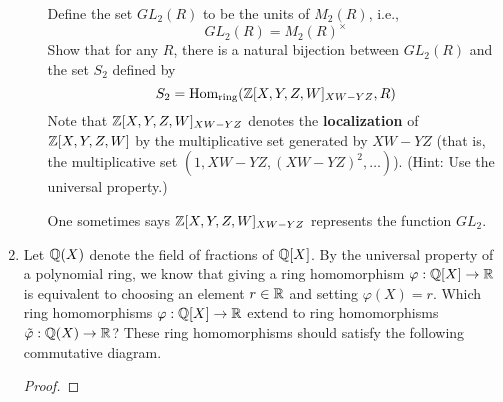 \documentclass[../psets.tex]{subfiles}
\begin{document}
\begin{enumerate}
\begin{enumerate}[label={(\alph*)}]
        Define the set $GL_2(R)$ to be the units of $M_2(R)$, i.e.,
        \begin{equation*}
            GL_2(R) = M_2(R)^\times
        \end{equation*}
        Show that for any $R$, there is a natural bijection between $GL_2(R)$ and the set $S_2$ defined by
        \begin{equation*}
            S_2 = \text{Hom}_\text{ring}(\mathbb{Z}[X,Y,Z,W]_{XW-YZ},R)
        \end{equation*}
        Note that $\mathbb{Z}[X,Y,Z,W]_{XW-YZ}$ denotes the \textbf{localization} of $\mathbb{Z}[X,Y,Z,W]$ by the multiplicative set generated by $XW-YZ$ (that is, the multiplicative set $(1,XW-YZ,(XW-YZ)^2,\dots)$). (Hint: Use the universal property.)\par
        One sometimes says $\mathbb{Z}[X,Y,Z,W]_{XW-YZ}$ represents the function $GL_2$.
    \end{enumerate}
    \item Let $\mathbb{Q}(X)$ denote the field of fractions of $\mathbb{Q}[X]$. By the universal property of a polynomial ring, we know that giving a ring homomorphism $\varphi:\mathbb{Q}[X]\to\mathbb{R}$ is equivalent to choosing an element $r\in\mathbb{R}$ and setting $\varphi(X)=r$. Which ring homomorphisms $\varphi:\mathbb{Q}[X]\to\mathbb{R}$ extend to ring homomorphisms $\tilde{\varphi}:\mathbb{Q}(X)\to\mathbb{R}$? These ring homomorphisms should satisfy the following commutative diagram.
    \begin{center}
    \end{center}
    \begin{proof}




\end{proof}
\end{enumerate}
\end{document}
